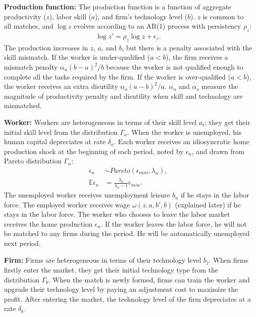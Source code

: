 \documentclass[12pt]{article}
\newcommand{\E}{\mathbb{E}}
\newcommand{\1}{\mathbb{1}}
\begin{document}
\textbf{Production function: }The production function is a function of aggregate productivity ($z$), labor skill ($a$), and firm's technology level ($b$). $z$ is common to all matches, and $\log z$ evolves according to an AR(1) process with persistency $\rho_z$:
\begin{align*}
\log z' = \rho_z \log z +\epsilon_z.
\end{align*}
The production increases in $z$, $a$, and $b$, but there is a penalty associated with the skill mismatch. If the worker is under-qualified ($a<b$), the firm receives a mismatch penalty $\alpha_u(b-a)^2/b$ because the worker is not qualified enough to complete all the tasks required by the firm. If the worker is over-qualified ($a<b$), the worker receives an extra disutility $\alpha_o(a-b)^2/a$. $\alpha_u$ and $\alpha_o$ measure the magnitude of productivity penalty and disutility when skill and technology are mismatched. 

\textbf{Worker: }Workers are heterogeneous in terms of their skill level $a_i$; they get their initial skill level from the distribution $\Gamma_a$. 
When the worker is unemployed, his human capital depreciates at rate $\delta_a$. Each worker receives an idiosyncratic home production shock at the beginning of each period, noted by $\epsilon_n$, and drawn from Pareto distribution $\Gamma_n$:
\begin{align*}
\epsilon_n &\sim Pareto(\epsilon_{min},\lambda_n),  \\
\E\epsilon_n &= \frac{\lambda_n}{\lambda_n-1}\epsilon_{min}.
\end{align*}
The unemployed worker receives unemployment leisure $b_u$ if he stays in the labor force. The employed worker receives wage $\omega(z,a,b',b)$ (explained later) if he stays in the labor force. The worker who chooses to leave the labor market receives the home production $\epsilon_n$. If the worker leaves the labor force, he will not be matched to any firms during the period. He will be automatically unemployed next period.

\textbf{Firm: }Firms are heterogeneous in terms of their technology level $b_j$. When firms firstly enter the market, they get their initial technology type from the distribution $\Gamma_b$. When the match is newly formed, firms can train the worker and upgrade their technology level by paying an adjustment cost to maximize the profit. After entering the market, the technology level of the firm depreciates at a rate $\delta_b$. 
\end{document}
